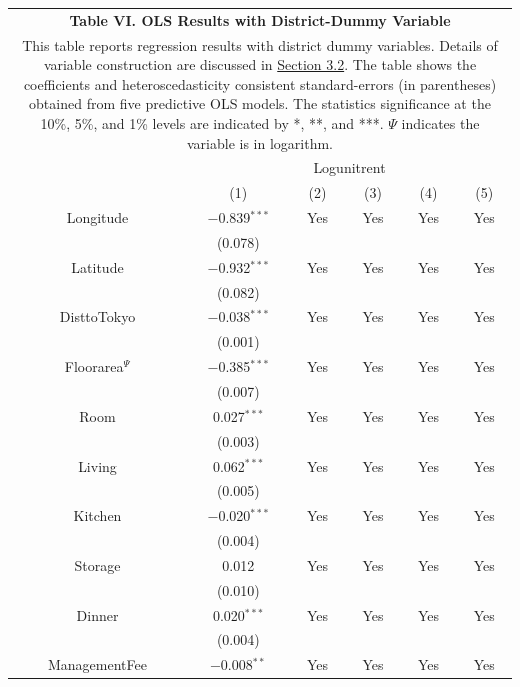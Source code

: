 \documentclass[a4paper, 12pt]{article} %
\begin{document}
\newpage

\begin{longtable}[c]{cccccc}
\label{tb6} \\
\multicolumn{6}{c}{\textbf{Table VI. OLS Results with District-Dummy Variable}} \\
\multicolumn{6}{p{14.5cm}}{This table reports regression results with district dummy variables. Details of variable construction are discussed in \hyperref[sec32]{Section 3.2}. The table shows the coefficients and heteroscedasticity consistent standard-errors (in parentheses) obtained from five predictive OLS models. The statistics significance at the 10\%, 5\%, and 1\% levels are indicated by *, **, and ***. $\Psi$ indicates the variable is in logarithm.} \\
\hline
& \multicolumn{5}{c}{Logunitrent} \\
& (1) & (2) & (3) & (4) & (5) \\
\hline
\addlinespace[0.5em]
Longitude & $-$0.839$^{***}$ & Yes & Yes & Yes & Yes \\
& (0.078) & & & & \\
\addlinespace[0.5em]
Latitude & $-$0.932$^{***}$ & Yes & Yes & Yes & Yes \\
& (0.082) & & & & \\
\addlinespace[0.5em]
DisttoTokyo & $-$0.038$^{***}$ & Yes & Yes & Yes & Yes \\
& (0.001) & & & & \\
\addlinespace[0.5em]
Floorarea$^{\Psi}$ & $-$0.385$^{***}$ & Yes & Yes & Yes  & Yes \\
& (0.007) & & & & \\
\addlinespace[0.5em]
Room & 0.027$^{***}$ & Yes & Yes & Yes & Yes \\
& (0.003) & & & & \\
\addlinespace[0.5em]
Living & 0.062$^{***}$ & Yes & Yes & Yes & Yes \\
& (0.005) & & & & \\
\addlinespace[0.5em]
Kitchen & $-$0.020$^{***}$ & Yes & Yes & Yes & Yes \\
& (0.004) & & & & \\
\addlinespace[0.5em]
Storage & 0.012 & Yes & Yes & Yes & Yes \\
& (0.010) & & & & \\
\addlinespace[0.5em]
Dinner & 0.020$^{***}$ & Yes & Yes & Yes & Yes \\
& (0.004) & & & & \\
\addlinespace[0.5em]
ManagementFee & $-$0.008$^{**}$ & Yes & Yes & Yes & Yes \\

\end{longtable}
\end{document}
